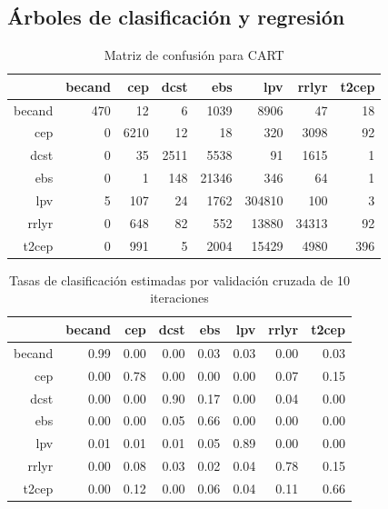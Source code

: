 \documentclass[letterpaper,12pt]{book}
\begin{document}
\subsection{Árboles de clasificación y regresión}
\begin{table}[ht]
  \centering
  \caption{Matriz de confusión para CART} 
  \label{cuadro:cmCart}
  \begin{tabular}{rrrrrrrr}
    \hline
    & becand & cep & dcst & ebs & lpv & rrlyr & t2cep \\ 
    \hline
    becand & 470 &  12 &   6 & 1039 & 8906 &  47 &  18 \\ 
    cep &   0 & 6210 &  12 &  18 & 320 & 3098 &  92 \\ 
    dcst &   0 &  35 & 2511 & 5538 &  91 & 1615 &   1 \\ 
    ebs &   0 &   1 & 148 & 21346 & 346 &  64 &   1 \\ 
    lpv &   5 & 107 &  24 & 1762 & 304810 & 100 &   3 \\ 
    rrlyr &   0 & 648 &  82 & 552 & 13880 & 34313 &  92 \\ 
    t2cep &   0 & 991 &   5 & 2004 & 15429 & 4980 & 396 \\ 
    \hline
  \end{tabular}
\end{table}

\begin{table}[ht]
  \centering
  \caption{Tasas de clasificación estimadas por validación cruzada de 10 iteraciones} 
  \label{table:cmCvCart}
  \begin{tabular}{rrrrrrrr}
    \hline
    & becand & cep & dcst & ebs & lpv & rrlyr & t2cep \\ 
    \hline
    becand & 0.99 & 0.00 & 0.00 & 0.03 & 0.03 & 0.00 & 0.03 \\ 
    cep & 0.00 & 0.78 & 0.00 & 0.00 & 0.00 & 0.07 & 0.15 \\ 
    dcst & 0.00 & 0.00 & 0.90 & 0.17 & 0.00 & 0.04 & 0.00 \\ 
    ebs & 0.00 & 0.00 & 0.05 & 0.66 & 0.00 & 0.00 & 0.00 \\ 
    lpv & 0.01 & 0.01 & 0.01 & 0.05 & 0.89 & 0.00 & 0.00 \\ 
    rrlyr & 0.00 & 0.08 & 0.03 & 0.02 & 0.04 & 0.78 & 0.15 \\ 
    t2cep & 0.00 & 0.12 & 0.00 & 0.06 & 0.04 & 0.11 & 0.66 \\ 
    \hline
  \end{tabular}
\end{table}
\end{document}
